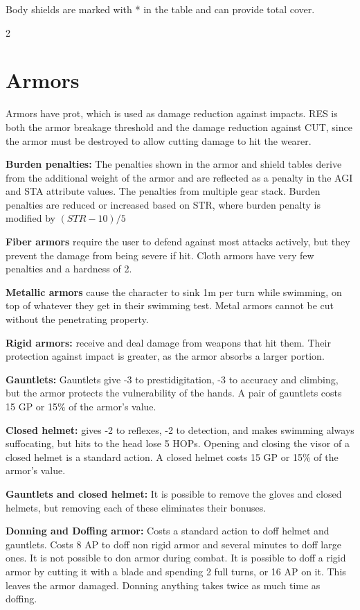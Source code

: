 Body shields are marked with * in the table and can provide total cover.

\begin{multicols}{2}

\section{Armors}

Armors have prot, which is used as damage reduction against impacts. RES is both the armor breakage threshold and the damage reduction against CUT, since the armor must be destroyed to allow cutting damage to hit the wearer.

\textbf{Burden penalties:} The penalties shown in the armor and shield tables derive from the additional weight of the armor and are reflected as a penalty in the AGI and STA attribute values. The penalties from multiple gear stack. Burden penalties are reduced or increased based on STR, where burden penalty is modified by $(STR-10)/5$

\textbf{Fiber armors} require the user to defend against most attacks actively, but they prevent the damage from being severe if hit. Cloth armors have very few penalties and a hardness of 2.

\textbf{Metallic armors} cause the character to sink 1m per turn while swimming, on top of whatever they get in their swimming test. Metal armors cannot be cut without the penetrating property.

\textbf{Rigid armors:} receive and deal damage from weapons that hit them. Their protection against impact is greater, as the armor absorbs a larger portion.

\textbf{Gauntlets:} Gauntlets give -3 to prestidigitation, -3 to accuracy and climbing, but the armor protects the vulnerability of the hands. A pair of gauntlets costs 15 GP or 15\% of the armor's value.

\textbf{Closed helmet:} gives -2 to reflexes, -2 to detection, and makes swimming always suffocating, but hits to the head lose 5 HOPs. Opening and closing the visor of a closed helmet is a standard action. A closed helmet costs 15 GP or 15\% of the armor's value.

\textbf{Gauntlets and closed helmet:} It is possible to remove the gloves and closed helmets, but removing each of these eliminates their bonuses.

\textbf{Donning and Doffing armor:} Costs a standard action to doff helmet and gauntlets. Costs 8 AP to doff non rigid armor and several minutes to doff large ones. It is not possible to don armor during combat. It is possible to doff a rigid armor by cutting it with a blade and spending 2 full turns, or 16 AP on it. This leaves the armor damaged. Donning anything takes twice as much time as doffing.

\end{multicols}

